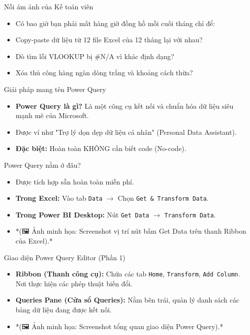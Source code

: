\documentclass[aspectratio=169]{beamer}
\begin{document}
\begin{frame}{Nỗi ám ảnh của Kế toán viên}
    \begin{itemize}
        \item Có bao giờ bạn phải mất hàng giờ đồng hồ mỗi cuối tháng chỉ để:
        \item Copy-paste dữ liệu từ 12 file Excel của 12 tháng lại với nhau?
        \item Dò tìm lỗi VLOOKUP bị \#N/A vì khác định dạng?
        \item Xóa thủ công hàng ngàn dòng trắng và khoảng cách thừa?
    \end{itemize}
\end{frame}


\begin{frame}{Giải pháp mang tên Power Query}
    \begin{itemize}
        \item \textbf{Power Query là gì?} Là một công cụ kết nối và chuẩn hóa dữ liệu siêu mạnh mẽ của Microsoft.
        \item Được ví như "Trợ lý dọn dẹp dữ liệu cá nhân" (Personal Data Assistant).
        \item \textbf{Đặc biệt:} Hoàn toàn KHÔNG cần biết code (No-code).
    \end{itemize}
\end{frame}


\begin{frame}{Power Query nằm ở đâu?}
    \begin{itemize}
        \item Được tích hợp sẵn hoàn toàn miễn phí.
        \item \textbf{Trong Excel:} Vào tab \texttt{Data} $\rightarrow$ Chọn \texttt{Get \& Transform Data}.
        \item \textbf{Trong Power BI Desktop:} Nút \texttt{Get Data} $\rightarrow$ \texttt{Transform Data}.
        \item *(🖼️ Ảnh minh họa: Screenshot vị trí nút bấm Get Data trên thanh Ribbon của Excel).*
    \end{itemize}
\end{frame}


\begin{frame}{Giao diện Power Query Editor (Phần 1)}
    \begin{itemize}
        \item \textbf{Ribbon (Thanh công cụ):} Chứa các tab \texttt{Home}, \texttt{Transform}, \texttt{Add Column}. Nơi thực hiện các phép thuật biến đổi.
        \item \textbf{Queries Pane (Cửa sổ Queries):} Nằm bên trái, quản lý danh sách các bảng dữ liệu đang được kết nối.
        \item *(🖼️ Ảnh minh họa: Screenshot tổng quan giao diện Power Query).*
    \end{itemize}
\end{frame}
\end{document}
